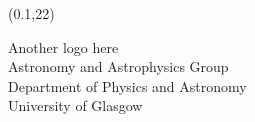 \documentclass[a0,portrait]{a0poster}
\begin{document}
\begin{textblock}{3}(0.1,22)
  \begin{center}
    Another logo here
\color{red}\\Astronomy and Astrophysics Group\\Department of Physics and
  Astronomy\\University of Glasgow
  \end{center}
\end{textblock}
\end{document}
